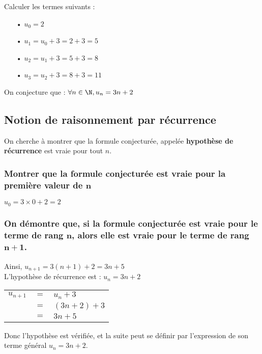 Calculer les termes suivants : 

\begin{itemize}
\item[•] $u_0 = 2$
\item[•] $ u_1 = u_0 + 3 = 2 + 3 = 5$ 
\item[•] $ u_2 = u_1 + 3 = 5 + 3 = 8$ 
\item[•] $ u_3 = u_2 + 3 = 8 + 3 = 11$
\end{itemize}

\vspace*{.3cm}

On conjecture que : $\forall n \in \N, u_n = 3n + 2$

\subsection{Notion de raisonnement par récurrence}

On cherche à montrer que la formule conjecturée, appelée \textbf{hypothèse de récurrence} est vraie pour tout $n$.

\subsubsection{Montrer que la formule conjecturée est vraie pour la première valeur de $\mathbf{n}$}

$u_0 = 3 \times 0 + 2 = 2$ 

\subsubsection{On démontre que, si la formule conjecturée est vraie pour le terme de rang $\mathbf{n}$, alors elle est vraie pour le terme de rang $\mathbf{n + 1}$.}

Ainsi, $u_{n+1} = 3\left(n+1\right) + 2 = 3n + 5$ \\

L'hypothèse de récurrence est : $u_n = 3n + 2$ \\

\begin{tabular}{lll}
$u_{n+1}$ & $=$ & $u_n + 3$ \\
& $=$ & $\left(3n + 2\right) + 3$ \\
& $=$ & $3n + 5$ \\ 
\end{tabular}

\vspace*{.3cm}

Donc l'hypothèse est vérifiée, et la suite peut se définir par l'expression de son terme général $u_n = 3n + 2$.

